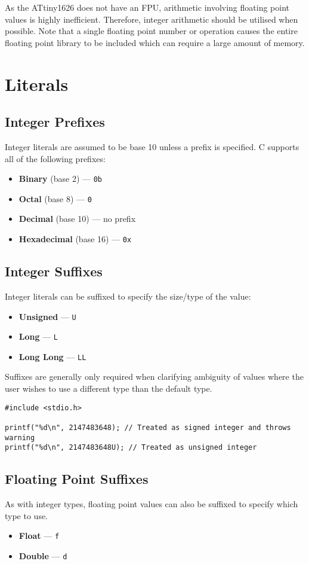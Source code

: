 \documentclass{report}
\begin{document}
As the ATtiny1626 does not have an FPU, arithmetic involving floating
point values is highly inefficient. Therefore, integer arithmetic
should be utilised when possible. Note that a single floating point
number or operation causes the entire floating point library to be
included which can require a large amount of memory.
\chapter{Literals}
\section{Integer Prefixes}
Integer literals are assumed to be base 10 unless a prefix is
specified. C supports all of the following prefixes:
\begin{itemize}
    \item \textbf{Binary} (base 2) --- \texttt{0b}
    \item \textbf{Octal} (base 8) --- \texttt{0}
    \item \textbf{Decimal} (base 10) --- no prefix
    \item \textbf{Hexadecimal} (base 16) --- \texttt{0x}
\end{itemize}
\section{Integer Suffixes}
Integer literals can be suffixed to specify the size/type of the value:
\begin{itemize}
    \item \textbf{Unsigned} --- \texttt{U}
    \item \textbf{Long} --- \texttt{L}
    \item \textbf{Long Long} --- \texttt{LL}
\end{itemize}
Suffixes are generally only required when clarifying ambiguity of values where the user wishes to use a different type than the default type.
\begin{verbatim}
#include <stdio.h>

printf("%d\n", 2147483648); // Treated as signed integer and throws warning
printf("%d\n", 2147483648U); // Treated as unsigned integer
\end{verbatim}
\section{Floating Point Suffixes}
As with integer types, floating point values can also be suffixed to
specify which type to use.
\begin{itemize}
    \item \textbf{Float} --- \texttt{f}
    \item \textbf{Double} --- \texttt{d}
\end{itemize}
\end{document}
